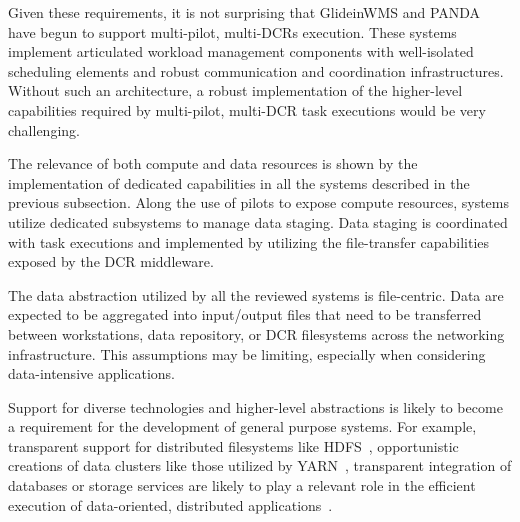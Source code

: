 \documentclass{sig-alternate}
\begin{document}

Given these requirements, it is not surprising that GlideinWMS and PANDA have
begun to support multi-pilot, multi-DCRs execution. These \pilot systems
implement articulated workload management components with well-isolated
scheduling elements and robust communication and coordination infrastructures.
Without such an architecture, a robust implementation of the higher-level
capabilities required by multi-pilot, multi-DCR task executions would be very
challenging.



The relevance of both compute and data resources is shown by the implementation
of dedicated capabilities in all the \pilot systems described in the previous
subsection. Along the use of pilots to expose compute resources, \pilot systems
utilize dedicated subsystems to manage data staging. Data staging is coordinated
with task executions and implemented by utilizing the file-transfer capabilities
exposed by the DCR middleware.

The data abstraction utilized by all the reviewed \pilot systems is
file-centric. Data are expected to be aggregated into input/output files that
need to be transferred between workstations, data repository, or DCR filesystems
across the networking infrastructure. This assumptions may be limiting,
especially when considering data-intensive applications.

Support for diverse technologies and higher-level abstractions is likely to
become a requirement for the development of general purpose \pilot systems. For
example, transparent support for distributed filesystems like
HDFS~\cite{borthakur2008}, opportunistic creations of data clusters like those
utilized by YARN~\cite{vavilapalli2013}, transparent integration of databases or
storage services are likely to play a relevant role in the efficient execution
of data-oriented, distributed
applications~\cite{rey2015open,sboner2015primer,zhang2010}.

\end{document}
